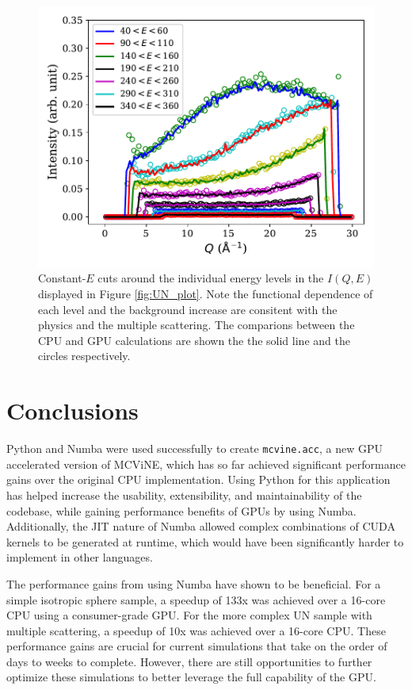 \begin{figure}[h]
\centering
\includegraphics[width=\columnwidth]{figures/Constant_E_cuts_high_contrast.pdf}
\caption{Constant-$E$ cuts around the individual energy levels 
in the $I(Q, E)$ displayed in
Figure \ref{fig:UN_plot}. Note the functional dependence of each level and the background increase are consitent with the physics and the multiple scattering. The comparions between the CPU and GPU calculations are shown the the solid line and the circles respectively.  
}
\label{fig:UN_cuts}
\end{figure}

\section{Conclusions}

Python and Numba were used successfully to create \texttt{mcvine.acc}, a new GPU accelerated version of MCViNE, which has so far achieved significant performance gains over the original CPU implementation. Using Python for this application has helped increase the usability, extensibility, and maintainability of the codebase, while gaining performance benefits of GPUs by using Numba. Additionally, the JIT nature of Numba allowed complex combinations of CUDA kernels to be generated at runtime, which would have been significantly harder to implement in other languages.

The performance gains from using Numba have shown to be beneficial. For a simple isotropic sphere sample, a speedup of 133x was achieved over a 16-core CPU using a consumer-grade GPU. For the more complex UN sample with multiple scattering, a speedup of 10x was achieved over a 16-core CPU. These performance gains are crucial for current simulations that take on the order of days to weeks to complete. However, there are still opportunities to further optimize these simulations to better leverage the full capability of the GPU. 

